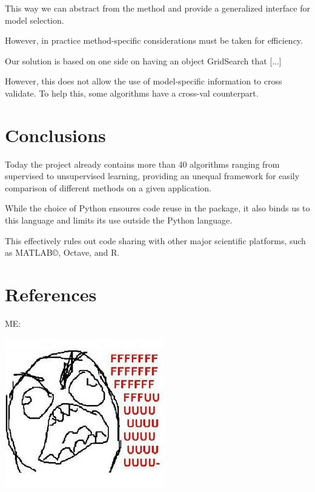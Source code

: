 \documentclass[twoside,11pt]{article}
\begin{document}
This way we can abstract from the method
and provide a generalized interface for model selection.


However, in practice method-specific considerations must be taken for
efficiency.


Our solution is based on one side on having an object GridSearch that
[...] 

However, this does not allow the use of model-specific information to
cross validate. To help this, some algorithms have a cross-val
counterpart.


\section{Conclusions}

Today the project already contains more than 40 algorithms ranging
from supervised to unsupervised learning, providing an unequal
framework for easily comparison of different methods on a given
application.



While the choice of Python ensoures code reuse in the package, it also
binds us to this language and limits its use outside the Python
language.

This effectively rules out code sharing with other major scientific
platforms, such as MATLAB©, Octave, and R.



\section{References}

ME:

\includegraphics{images/parafaber.jpg}
\end{document}
